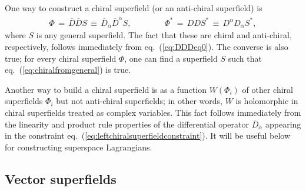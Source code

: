 \documentclass[12pt]{article}
\def\beq{\begin{eqnarray}}
\def\eeq{\end{eqnarray}}
\def\Dcon{\overline D}
\begin{document}
One way to construct a chiral superfield (or an anti-chiral superfield) is 
\beq
\Phi \,=\, 
\Dcon\Dcon S
\,\equiv\, 
\Dcon_{\dot\alpha} \Dcon^{\dot \alpha} S,
\qquad\qquad
\Phi^* \,=\, DDS^* \,\equiv\, D^\alpha D_\alpha S^*,
\label{eq:chiralfromgeneral}
\eeq 
where $S$ is any 
general superfield. The fact that these are chiral and anti-chiral, respectively, 
follows immediately from eq.~(\ref{eq:DDDeq0}).
The converse is also true; 
for every chiral superfield $\Phi$, one can find a superfield $S$ such that 
eq.~(\ref{eq:chiralfromgeneral}) is true. 

Another way to build a chiral superfield is as 
a function $W(\Phi_i)$ of other chiral superfields $\Phi_i$ 
but not anti-chiral superfields; in other words, $W$ is holomorphic in 
chiral superfields treated as complex variables. 
This fact follows immediately from 
the linearity and product rule properties of the differential operator 
$\Dcon_{\dot \alpha}$ appearing in the constraint 
eq.~(\ref{eq:leftchiralsuperfieldconstraint}). It will be useful below 
for constructing superspace Lagrangians.

\subsection{Vector superfields\label{subsec:vectorsuperfields}}
\setcounter{equation}{0}
\setcounter{footnote}{2}
\end{document}
